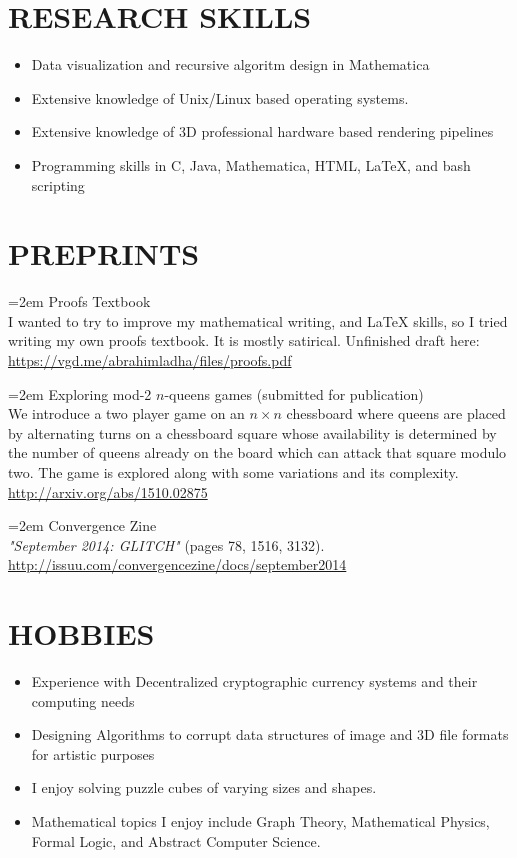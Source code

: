 \documentclass[11pt]{article} %
\begin{document}
\section*{RESEARCH SKILLS}
\begin{itemize}
  \setlength{\itemsep}{1pt}
  \setlength{\parskip}{0pt}
  \setlength{\parsep}{0pt}
\item Data visualization and recursive algoritm design in Mathematica
\item Extensive knowledge of Unix/Linux based operating systems.
\item Extensive knowledge of 3D professional hardware based rendering pipelines
\item Programming skills in C, Java, Mathematica, HTML, \LaTeX , and bash scripting
\end{itemize}
\section*{PREPRINTS}
\hangindent=2em
Proofs Textbook\\
I wanted to try to improve my mathematical writing, and  {\LaTeX} skills, so I tried writing my own proofs textbook. It is mostly satirical. Unfinished draft here: \url{https://vgd.me/abrahimladha/files/proofs.pdf} 

\hangindent=2em
Exploring mod-2 $n$-queens games (submitted for publication)\\
We introduce a two player game on an $n \times n$ chessboard where queens are placed by alternating turns on a chessboard square whose availability is determined by the number of queens already on the board which can attack that square modulo two. The game is explored along with some variations and its complexity.
\url{http://arxiv.org/abs/1510.02875}

\hangindent=2em
Convergence Zine\\
\emph{"September 2014: GLITCH"} ​(pages 7­8, 15­16, 31­32). \url{http://issuu.com/convergencezine/docs/september2014}


\section*{HOBBIES}
\begin{itemize}
  \setlength{\itemsep}{1pt}
  \setlength{\parskip}{0pt}
  \setlength{\parsep}{0pt}
\item Experience with Decentralized cryptographic currency systems and their computing needs
\item Designing Algorithms to corrupt data structures of image and 3D file formats for artistic purposes
\item I enjoy solving puzzle cubes of varying sizes and shapes.
\item Mathematical topics I enjoy include Graph Theory, Mathematical Physics, Formal Logic, and Abstract Computer Science.
\end{itemize}
\end{document}
